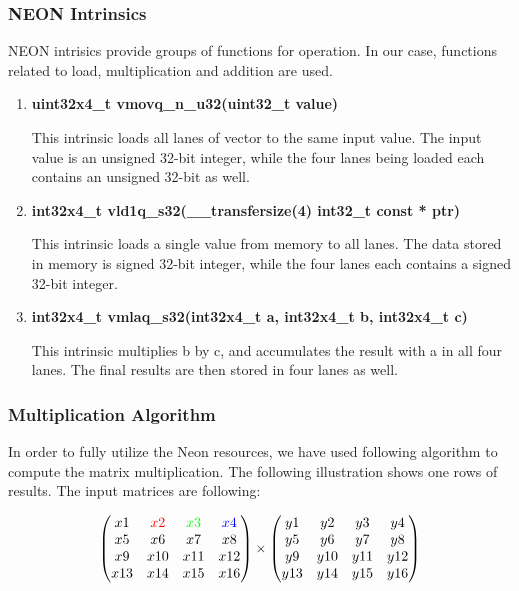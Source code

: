 \subsubsection{NEON Intrinsics}
NEON intrisics \cite{Intrinsics}provide groups of functions for operation. 
In our case, functions related to load, multiplication and addition are used. 
\begin{enumerate}
\item \textbf{uint32x4\_t  vmovq\_n\_u32(uint32\_t value)}

This intrinsic loads all lanes of vector to the same input value. 
The input value is an unsigned 32-bit integer, 
while the four lanes being loaded each contains an unsigned 32-bit as well.


\item \textbf{int32x4\_t   vld1q\_s32(\_\_transfersize(4) int32\_t const * ptr)}

This intrinsic loads a single value from memory to all lanes.
The data stored in memory is signed 32-bit integer, 
while the four lanes each contains a signed 32-bit integer.

\item \textbf{int32x4\_t   vmlaq\_s32(int32x4\_t a, int32x4\_t b, int32x4\_t c)}

This intrinsic multiplies b by c, and accumulates the result with a in all four lanes.
The final results are then stored in four lanes as well.
\end{enumerate}

\subsubsection{Multiplication Algorithm}

In order to fully utilize the Neon resources, we have used following algorithm to compute the matrix multiplication. The following illustration shows one rows of results.
The input matrices are following:

$$
\begin{pmatrix}
 x1 	& \color{red}{x2} 	& \color{green}{x3} & \color{blue}{x4}\\
 x5 	& x6 				& x7&x8\\
 x9 	& x10 				& x11&x12\\
 x13 	& x14 				& x15&x16\\
\end{pmatrix}
\times
\begin{pmatrix}
y1&y2&y3&y4\\
y5&y6&y7&y8\\
y9&y10&y11&y12\\
y13&y14&y15&y16\\
\end{pmatrix}
$$


